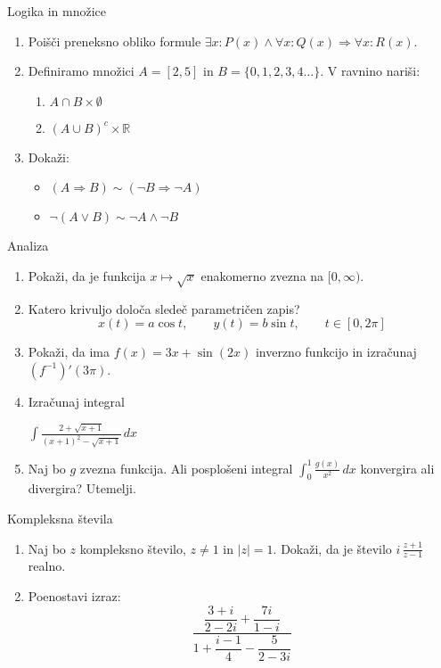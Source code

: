 \begin{frame}{Logika in množice}
	\begin{enumerate}
		\item
		Poišči preneksno obliko formule $\exists x:P(x) \land \forall x: Q(x) \Rightarrow \forall x: R(x)$.		\item 
		Definiramo množici $A=[ 2,5 ]$ in $B=\{ 0,1,2,3,4 \ldots\}$.
		V ravnino nariši:
		\begin{enumerate}
		   \item $A \cap B \times \emptyset$
		   \item $(A \cup B)^c \times \mathbb{R}$
		\end{enumerate}
		\item
		Dokaži:
		\begin{itemize}
			\item $(A \Rightarrow B) \sim (\lnot B \Rightarrow \lnot A)$
			\item $ \lnot(A \lor B) \sim \lnot A \land \lnot B$
		\end{itemize}
	\end{enumerate}
\end{frame}

\begin{frame}{Analiza}
	\begin{enumerate}
		\item
		Pokaži, da je funkcija $x \mapsto \sqrt {x}$
		enakomerno zvezna na $[0, \infty)$.
		\item 
		Katero krivuljo določa sledeč parametričen zapis?
		$$
		   x(t) = a \cos t, \qquad %
		   y(t) = b \sin t, \qquad %
		   t \in [0, 2 \pi]
		$$ 
		\item
		Pokaži, da ima $f(x)=3x + \sin(2x)$ inverzno funkcijo in izračunaj $(f^{-1})'(3\pi)$.
		
		\item
		Izračunaj integral 
		
		\(\displaystyle \int \frac{2+\sqrt{x+1}}{(x+1)^2-\sqrt{x+1}} \, dx \)
		\item 
		Naj bo $g$ zvezna funkcija. Ali posplošeni integral 
		\( \int_0^1 \frac{g(x)}{x^2}\,dx \)
		konvergira ali divergira? Utemelji.
	\end{enumerate}
\end{frame}

\begin{frame}{Kompleksna števila}
	\begin{enumerate}
		\item
		Naj bo $z$ kompleksno število, $z \ne 1$ in $|z| = 1$.
		Dokaži, da je število \( i \, \frac{z+1}{z-1} \) realno.
		\item
		Poenostavi izraz:
		$$ \frac{\dfrac{3+i}{2-2i} + \dfrac{7i}{1-i}}{1 + \dfrac{i-1}{4} - \dfrac{5}{2-3i}} $$
	\end{enumerate}
\end{frame}